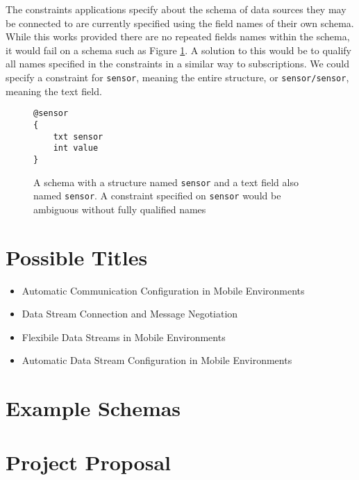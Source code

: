 \documentclass[12pt,twoside,notitlepage]{report}
\begin{document}
The constraints applications specify about the schema of data sources they may be connected to are currently specified using the field names of their own schema.
While this works provided there are no repeated fields names within the schema, it would fail on a schema such as Figure \ref{fig:repeatednameschema}. 
A solution to this would be to qualify all names specified in the constraints in a similar way to subscriptions. 
We could specify a constraint for {\tt sensor}, meaning the entire structure, or {\tt sensor/sensor}, meaning the text field.

\begin{figure}[tbh]
\begin{lstlisting}
@sensor
{
	txt sensor
	int value
}
\end{lstlisting}
\caption[Schema with repeated name]{A schema with a structure named {\tt sensor} and a text field also named {\tt sensor}. A constraint specified on {\tt sensor} would be ambiguous without fully qualified names}
\label{fig:repeatednameschema}
\end{figure}

\cleardoublepage


\nocite{*}

\cleardoublepage

\begin{appendix}

\chapter{Possible Titles}

\begin{itemize}
\item Automatic Communication Configuration in Mobile Environments
\item Data Stream Connection and Message Negotiation
\item Flexibile Data Streams in Mobile Environments
\item Automatic Data Stream Configuration in Mobile Environments
\end{itemize}

\cleardoublepage

\chapter{Example Schemas}



\cleardoublepage

\chapter{Project Proposal}



\end{appendix}
\end{document}
